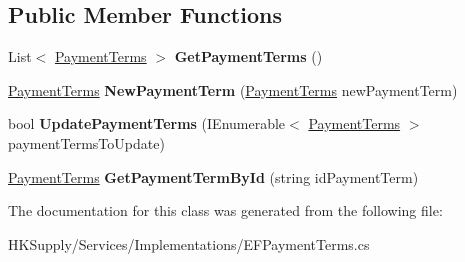 \subsection*{Public Member Functions}
\begin{DoxyCompactItemize}
\item 
\mbox{\label{class_h_k_supply_1_1_services_1_1_implementations_1_1_e_f_payment_terms_ac25676f756c8f74fcfaae9917acab9dc}} 
List$<$ \mbox{\hyperlink{class_h_k_supply_1_1_models_1_1_payment_terms}{Payment\+Terms}} $>$ {\bfseries Get\+Payment\+Terms} ()
\item 
\mbox{\label{class_h_k_supply_1_1_services_1_1_implementations_1_1_e_f_payment_terms_aad97ca4467044afefc6ee643d583262f}} 
\mbox{\hyperlink{class_h_k_supply_1_1_models_1_1_payment_terms}{Payment\+Terms}} {\bfseries New\+Payment\+Term} (\mbox{\hyperlink{class_h_k_supply_1_1_models_1_1_payment_terms}{Payment\+Terms}} new\+Payment\+Term)
\item 
\mbox{\label{class_h_k_supply_1_1_services_1_1_implementations_1_1_e_f_payment_terms_af21a7a268b3e0c7a8b87822818241369}} 
bool {\bfseries Update\+Payment\+Terms} (I\+Enumerable$<$ \mbox{\hyperlink{class_h_k_supply_1_1_models_1_1_payment_terms}{Payment\+Terms}} $>$ payment\+Terms\+To\+Update)
\item 
\mbox{\label{class_h_k_supply_1_1_services_1_1_implementations_1_1_e_f_payment_terms_a998150727aba381a2c76a36d232c54c0}} 
\mbox{\hyperlink{class_h_k_supply_1_1_models_1_1_payment_terms}{Payment\+Terms}} {\bfseries Get\+Payment\+Term\+By\+Id} (string id\+Payment\+Term)
\end{DoxyCompactItemize}


The documentation for this class was generated from the following file\+:\begin{DoxyCompactItemize}
\item 
H\+K\+Supply/\+Services/\+Implementations/E\+F\+Payment\+Terms.\+cs\end{DoxyCompactItemize}
